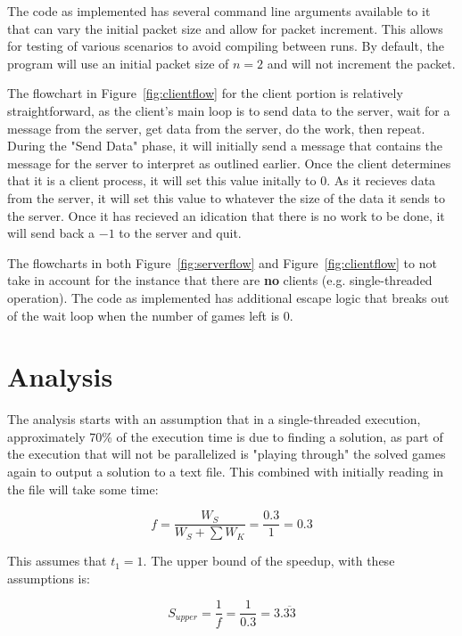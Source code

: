 \documentclass{article}
\begin{document}
  The code as implemented has several command line arguments available to it
  that can vary the initial packet size and allow for packet increment. This
  allows for testing of various scenarios to avoid compiling between runs. By
  default, the program will use an initial packet size of \(n=2\) and will not
  increment the packet.

  The flowchart in Figure~\ref{fig:clientflow} for the client portion is
  relatively straightforward, as the client's main loop is to send data to the
  server, wait for a message from the server, get data from the server, do the
  work, then repeat. During the "Send Data" phase, it will initially send a
  message that contains the message for the server to interpret as outlined
  earlier. Once the client determines that it is a client process, it will
  set this value initally to \(0\). As it recieves data from the server, it
  will set this value to whatever the size of the data it sends to the server.
  Once it has recieved an idication that there is no work to be done, it will
  send back a \(-1\) to the server and quit.

  The flowcharts in both Figure~\ref{fig:serverflow} and 
  Figure~\ref{fig:clientflow} to not take in account for the instance that
  there are \textbf{no} clients (e.g. single-threaded operation). The code as
  implemented has additional escape logic that breaks out of the wait loop when
  the number of games left is 0.

  \section{Analysis}

  The analysis starts with an assumption that in a single-threaded execution,
  approximately 70\% of the execution time is due to finding a solution, as part
  of the execution that will not be parallelized is "playing through" the solved
  games again to output a solution to a text file. This combined with initially
  reading in the file will take some time:

  \[ f = \frac{W_S}{W_S + \sum W_K} = \frac{0.3}{1} = 0.3 \]

  This assumes that \(t_1 = 1\). The upper bound of the speedup, with these
  assumptions is:

  \[ S_{upper} = \frac{1}{f} = \frac{1}{0.3} = 3.\overline{33} \]
\end{document}
